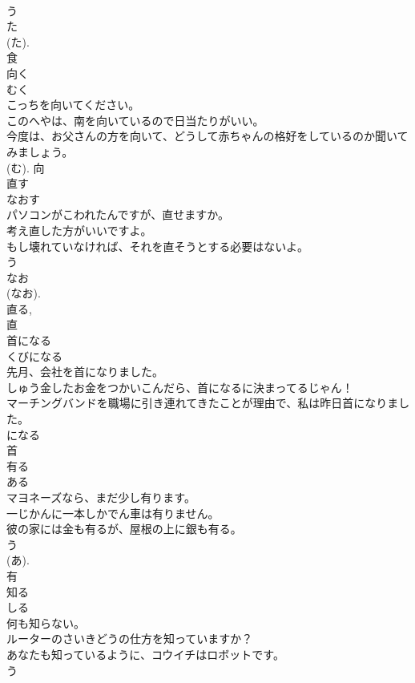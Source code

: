 \documentclass[8pt]{extreport}
\begin{document}
\begin{CJK}{UTF8}{min}
\\	う 
\\	た 
\\	(た). 
\\	食	
\\	向く	
\\	むく	
\\	こっちを向いてください。	
\\	このへやは、南を向いているので日当たりがいい。	
\\	今度は、お父さんの方を向いて、どうして赤ちゃんの格好をしているのか聞いてみましょう。	
\\	(む).	向	
\\	直す	
\\	なおす	
\\	パソコンがこわれたんですが、直せますか。	
\\	考え直した方がいいですよ。	
\\	もし壊れていなければ、それを直そうとする必要はないよ。	
\\	う 
\\	なお 
\\	(なお). 
\\	直る, 
\\	直	
\\	首になる	
\\	くびになる	
\\	先月、会社を首になりました。	
\\	しゅう金したお金をつかいこんだら、首になるに決まってるじゃん！	
\\	マーチングバンドを職場に引き連れてきたことが理由で、私は昨日首になりました。	
\\	になる 
\\	首	
\\	有る	
\\	ある	
\\	マヨネーズなら、まだ少し有ります。	
\\	一じかんに一本しかでん車は有りません。	
\\	彼の家には金も有るが、屋根の上に銀も有る。	
\\	う 
\\	(あ).
\\	有	
\\	知る	
\\	しる	
\\	何も知らない。	
\\	ルーターのさいきどうの仕方を知っていますか？	
\\	あなたも知っているように、コウイチはロボットです。	
\\	う 

\end{CJK}
\end{document}
